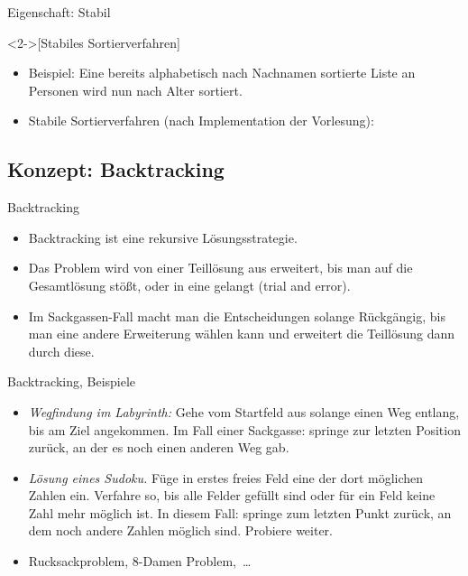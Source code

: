 \begin{frame}{Eigenschaft: Stabil}
    \begin{definition}<2->[Stabiles Sortierverfahren]
    \end{definition}
    \begin{itemize}
        \widei
        \item<4-> Beispiel: Eine bereits alphabetisch nach Nachnamen sortierte Liste an Personen wird nun nach Alter sortiert. 
        \item<6-> Stabile Sortierverfahren (nach Implementation der Vorlesung): 
    \end{itemize}
\end{frame}


\subsection{Konzept: Backtracking}

\begin{frame}{Backtracking}
    \begin{itemize}[<+(1)->]
        \widei
        \item Backtracking ist eine rekursive Lösungsstrategie.
        \item Das Problem wird von einer Teillösung aus erweitert, bis man auf die Gesamtlösung stößt,\pause{} oder in eine  gelangt (trial and error).
        \item Im Sackgassen-Fall macht man die Entscheidungen solange Rückgängig, bis man eine andere Erweiterung wählen kann und erweitert die Teillösung dann durch diese.
    \end{itemize}
\end{frame}


\begin{frame}{Backtracking, Beispiele}
    \begin{itemize}[<+(1)->]
        \widei
        \item \emph{Wegfindung im Labyrinth:}\pause{} Gehe vom Startfeld aus solange einen Weg entlang, bis am Ziel angekommen.\pause{} Im Fall einer Sackgasse: springe zur letzten Position zurück, an der es noch einen anderen Weg gab.
        \item \emph{Lösung eines Sudoku.}\pause{} Füge in erstes freies Feld eine der dort möglichen Zahlen ein.\pause{} Verfahre so, bis alle Felder gefüllt sind oder für ein Feld keine Zahl mehr möglich ist.\pause{} In diesem Fall: springe zum letzten Punkt zurück, an dem noch andere Zahlen möglich sind. Probiere weiter.
        \item Rucksackproblem, 8-Damen Problem,~\ldots
    \end{itemize}
\end{frame}

